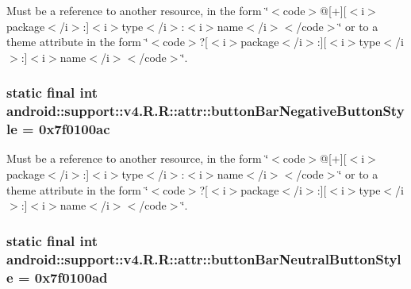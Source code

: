 Must be a reference to another resource, in the form \char`\"{}$<$code$>$@\mbox{[}+\mbox{]}\mbox{[}$<$i$>$package$<$/i$>$:\mbox{]}$<$i$>$type$<$/i$>$:$<$i$>$name$<$/i$>$$<$/code$>$\char`\"{} or to a theme attribute in the form \char`\"{}$<$code$>$?\mbox{[}$<$i$>$package$<$/i$>$:\mbox{]}\mbox{[}$<$i$>$type$<$/i$>$:\mbox{]}$<$i$>$name$<$/i$>$$<$/code$>$\char`\"{}. \hypertarget{classandroid_1_1support_1_1v4_1_1_r_1_1attr_0dacd501b4161f347a9010901c3de029}{
\subsubsection[{buttonBarNegativeButtonStyle}]{\setlength{\rightskip}{0pt plus 5cm}static final int android::support::v4.R.R::attr::buttonBarNegativeButtonStyle = 0x7f0100ac}}
\label{classandroid_1_1support_1_1v4_1_1_r_1_1attr_0dacd501b4161f347a9010901c3de029}


Must be a reference to another resource, in the form \char`\"{}$<$code$>$@\mbox{[}+\mbox{]}\mbox{[}$<$i$>$package$<$/i$>$:\mbox{]}$<$i$>$type$<$/i$>$:$<$i$>$name$<$/i$>$$<$/code$>$\char`\"{} or to a theme attribute in the form \char`\"{}$<$code$>$?\mbox{[}$<$i$>$package$<$/i$>$:\mbox{]}\mbox{[}$<$i$>$type$<$/i$>$:\mbox{]}$<$i$>$name$<$/i$>$$<$/code$>$\char`\"{}. \hypertarget{classandroid_1_1support_1_1v4_1_1_r_1_1attr_6ec20072a693edb0660ad4cc64c65dbe}{
\subsubsection[{buttonBarNeutralButtonStyle}]{\setlength{\rightskip}{0pt plus 5cm}static final int android::support::v4.R.R::attr::buttonBarNeutralButtonStyle = 0x7f0100ad}}
\label{classandroid_1_1support_1_1v4_1_1_r_1_1attr_6ec20072a693edb0660ad4cc64c65dbe}


